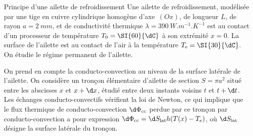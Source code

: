 \begin{exo}[PC][3][TD]{Principe d'une ailette de refroidissement}%
Une ailette de refroidissement, modélisée par une tige en cuivre cylindrique homogène d'axe~$(Ox)$, de longueur $L$, de rayon $a=\SI{2}{mm}$,
et de conductivité thermique $\lambda = \SI{390}{W.m^{-1}.K^{-1}}$ %
est au contact d'un processeur de température $T_0=\SI{60}{\dC}$
à son extrémité $x=0$. La surface de l'ailette est au contact de l'air à la température $T_{\rm{e}}=\SI{30}{\dC}$. On étudie le régime permanent de l'ailette.



On prend en compte la conducto-convection au niveau de la surface latérale de l'ailette.
On considère un tronçon élémentaire d'ailette de section $S=\pi a^2$ situé entre les abscisses $x$ et $x + \d x$, étudié entre deux instants voisins $t$ et $t + \d t$. Les échanges conducto-convectifs vérifient la loi de Newton, ce qui implique que le flux thermique de conducto-convection $\d \Phi_{\rm cc}$ perdue par ce tronçon par conducto-convection a pour expression $\d \Phi_{\rm cc} = \d S_{\rm lat} h(T(x)-T_e)$, où $ \d S_{\rm lat}$ désigne la surface latérale du tronçon.


\end{exo}
